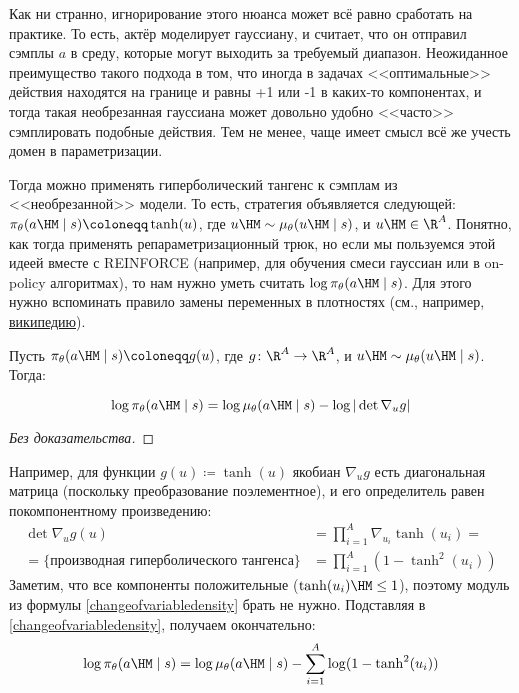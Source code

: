 \begin{remark}
Как ни странно, игнорирование этого нюанса может всё равно сработать на практике. То есть, актёр моделирует гауссиану, и считает, что он отправил сэмплы $a$ в среду, которые могут выходить за требуемый диапазон. Неожиданное преимущество такого подхода в том, что иногда в задачах <<оптимальные>> действия находятся на границе и равны +1 или -1 в каких-то компонентах, и тогда такая необрезанная гауссиана может довольно удобно <<часто>> сэмплировать подобные действия. Тем не менее, чаще имеет смысл всё же учесть домен в параметризации. 
\end{remark}

Тогда можно применять гиперболический тангенс к сэмплам из <<необрезанной>> модели. То есть, стратегия объявляется следующей: $\pi_\theta(a \HM \mid s) \coloneqq \tanh(u)$, где $u \HM \sim \mu_\theta(u \HM \mid s)$, и $u \HM \in \R^A$. Понятно, как тогда применять репараметризационный трюк, но если мы пользуемся этой идеей вместе с REINFORCE (например, для обучения смеси гауссиан или в on-policy алгоритмах), то нам нужно уметь считать $\log \pi_\theta(a \HM \mid s)$. Для этого нужно вспоминать правило замены переменных в плотностях (см., например, \href{https://ru.wikipedia.org/wiki/Плотность_вероятности#Плотность_преобразования_случайной_величины}{википедию}).

\begin{theorem}
Пусть $\pi_\theta(a \HM \mid s) \coloneqq g(u)$, где $g \colon \R^A \to \R^A$, и $u \HM \sim \mu_\theta(u \HM \mid s)$. Тогда:

\begin{equation}\label{changeofvariabledensity}
\log \pi_\theta(a \HM \mid s) = \log \mu_\theta(a \HM \mid s) - \log | \det \nabla_u g | 
\end{equation}

\begin{proof}[Без доказательства]
\end{proof}
\end{theorem}

\begin{example}
Например, для функции $g(u) \coloneqq \tanh (u)$ якобиан $\nabla_u g$ есть диагональная матрица (поскольку преобразование поэлементное), и его определитель равен покомпонентному произведению:
\begin{align*}
\det \nabla_u g(u) &= \prod_{i=1}^{A} \nabla_{u_i} \tanh(u_i) = \\
= \{ \text{производная гиперболического тангенса} \} &= \prod_{i=1}^A (1 - \tanh^2(u_i))    
\end{align*}
Заметим, что все компоненты положительные ($\tanh(u_i) \HM \le 1$), поэтому модуль из формулы \eqref{changeofvariabledensity} брать не нужно. Подставляя в \eqref{changeofvariabledensity}, получаем окончательно:
$$\log \pi_\theta(a \HM \mid s) = \log \mu_\theta(a \HM \mid s) - \sum_{i=1}^A \log (1 - \tanh^2(u_i)) $$
\end{example}

